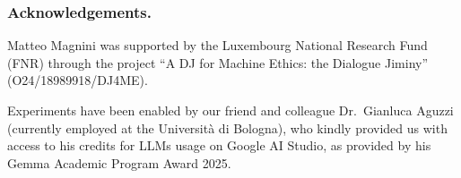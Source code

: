 \documentclass[runningheads]{llncs}
\begin{document}
\subsubsection*{Acknowledgements.}

Matteo Magnini was supported by the Luxembourg National Research Fund (FNR)
through the project ``A DJ for Machine Ethics: the Dialogue Jiminy'' (O24/18989918/DJ4ME).

Experiments have been enabled by our friend and colleague Dr.\ Gianluca Aguzzi
(currently employed at the Università di Bologna),
who kindly provided us with access to his credits for \acp{LLM} usage on Google AI Studio,
as provided by his Gemma Academic Program Award 2025.



\end{document}
